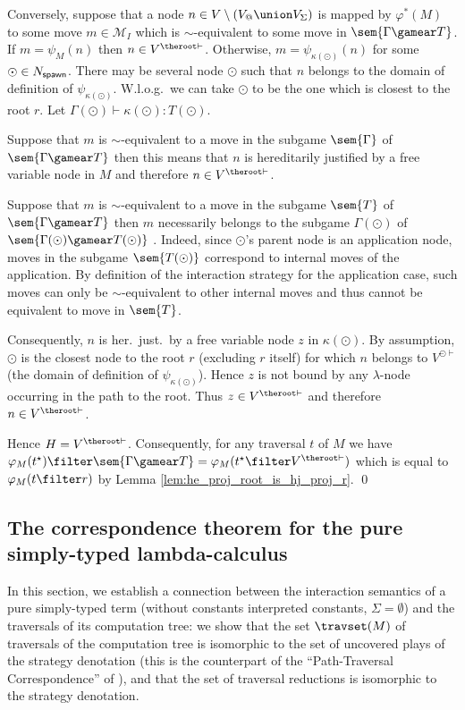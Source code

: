 Conversely, suppose that a node $n \in V\setminus (V_@\union V_\Sigma)$ is mapped by
$\varphi^*(M)$ to some move $m\in \mathcal{M}_I$ which is $\sim$-equivalent
to some move in $\sem{\Gamma \gamear T}$.
 If $m = \psi_M(n)$ then $n\in V^{\theroot\vdash}$. Otherwise,
$m = \psi_{\kappa(\odot)}(n)$ for some $\odot \in N_{\sf spawn}$. There
may be several node $\odot$ such that $n$ belongs to the domain of
definition of $\psi_{\kappa(\odot)}$. W.l.o.g.\ we can take $\odot$ to be
the one which is closest to the root $r$. Let $\Gamma(\odot) \vdash
\kappa(\odot) : T(\odot)$.
    \begin{compactitem}
    \item Suppose that $m$ is $\sim$-equivalent to a move in the subgame $\sem{\Gamma}$ of $\sem{\Gamma \gamear T}$
    then this means that $n$ is hereditarily justified by a free variable node in $M$ and therefore $n \in V^{\theroot\vdash}$.

    \item Suppose that $m$ is $\sim$-equivalent to a move in the subgame $\sem{T}$ of $\sem{\Gamma \gamear T}$
    then $m$ necessarily belongs to the subgame $\Gamma(\odot)$ of $\sem{\Gamma(\odot)\gamear T(\odot)}$ .
    Indeed, since $\odot$'s parent node is an application node, moves in the subgame
    $\sem{T(\odot)}$ correspond to internal moves of the application. By definition of
    the interaction strategy for the application case, such moves can only be $\sim$-equivalent to other internal
    moves and thus cannot be equivalent to move in $\sem{T}$.

    Consequently, $n$ is her.\ just.\ by a free variable node $z$ in $\kappa(\odot)$. By assumption, $\odot$ is the closest node to the root $r$ (excluding $r$ itself) for which $n$ belongs to $V^{\odot\vdash}$ (the domain of definition of $\psi_{\kappa(\odot)}$). Hence $z$ is not bound by any $\lambda$-node occurring in the path to the root. Thus $z\in
    V^{\theroot\vdash}$ and therefore $n \in V^{\theroot\vdash}$.
    \end{compactitem}
Hence $H = V^{\theroot\vdash}$. Consequently, for any traversal $t$
of $M$ we have $\varphi_M(t^\star) \filter \sem{\Gamma \gamear T} = \varphi_M(t^\star\filter V^{\theroot\vdash})$ which is equal to
$ \varphi_M(t\filter r)$ by Lemma
\ref{lem:he_proj_root_is_hj_proj_r}. \qed


\subsection{The correspondence theorem for the pure simply-typed lambda-calculus}
In this section, we establish a connection between the interaction
semantics of a pure simply-typed term (\ie without constants interpreted constants, $\Sigma = \emptyset$) and the traversals of its computation tree: we show that
the set $\travset(M)$ of traversals of the computation tree is
isomorphic to the set of uncovered plays of the strategy denotation
(this is the counterpart of the ``Path-Traversal Correspondence'' of
\cite{OngLics2006}), and that the set of traversal reductions is
isomorphic to the strategy denotation.


